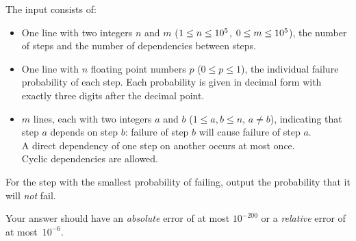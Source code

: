\begin{Input}
    The input consists of:
    \begin{itemize}
        \item One line with two integers $n$ and $m$ ($1 \leq n \leq 10^5$, $0 \leq m \leq 10^5$),
            the number of steps and the number of dependencies between steps.
        \item One line with $n$ floating point numbers $p$ ($0 \leq p \leq 1$),
            the individual failure probability of each step.
            Each probability is given in decimal form\footnotemark[1]{} with exactly three digits after the decimal point.
        \item $m$ lines, each with two integers $a$ and $b$ ($1 \leq a, b \leq n$, $a \neq b$),
            indicating that step $a$ depends on step $b$:
            failure of step $b$ will cause failure of step $a$. \\
            A direct dependency of one step on another occurs at most once. \\
            Cyclic dependencies are allowed.
    \end{itemize}
\end{Input}

\begin{Output}
    For the step with the smallest probability of failing,
    output the probability that it will \emph{not} fail.

    Your answer should have an \emph{absolute} error of at most $10^{-200}$
    or a \emph{relative} error of at most~$10^{-6}$.
\end{Output}
